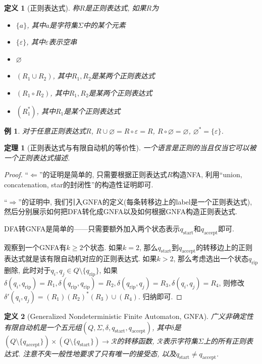 \documentclass[8pt]{article}
\theoremstyle{compact}
\newtheorem{theorem}{定理}[section]
\newtheorem{definition}{定义}[section]
\newtheorem{example}{例}[section]
\def\ge{\geqslant}
\begin{document}
\begin{definition}[正则表达式]
	称$R$是正则表达式, 如果$R$为
	\begin{itemize}
		\item $\{a\}$, 其中$a$是字符集$\Sigma$中的某个元素
		\item $\{\varepsilon\}$, 其中$\varepsilon$表示空串
		\item $\varnothing$
		\item $(R_1 \cup R_2)$, 其中$R_1, R_2$是某两个正则表达式
		\item $(R_1 \circ R_2)$, 其中$R_1, R_2$是某两个正则表达式
		\item $(R_1^*)$, 其中$R_1$是某个正则表达式
	\end{itemize}
\end{definition}
\begin{example}
	对于任意正则表达式$R$, $R \cup \varnothing = R \circ \varepsilon = R$, $R \circ \varnothing = \varnothing$, $\varnothing^* = \{\varepsilon\}$. 
\end{example}
\begin{theorem}[正则表达式与有限自动机的等价性]
	一个语言是正则的当且仅当它可以被一个正则表达式描述. 
\end{theorem}
\begin{proof}
	“$\Leftarrow$”的证明是简单的, 只需要根据正则表达式$R$构造NFA, 利用“union, concatenation, star的封闭性”的构造性证明即可. 

	“$\Rightarrow$”的证明中, 我们引入GNFA的定义(每条转移边上的label是一个正则表达式), 然后分别展示如何把DFA转化成GNFA以及如何根据GNFA构造正则表达式. 

	DFA转GNFA是简单的——只需要额外加入两个状态表示$q_{\text{start}}$和$q_{\text{accept}}$即可. 

	观察到一个GNFA有$k \ge 2$个状态. 如果$k=2$, 那么$q_{\text{start}}$到$q_{\text{accept}}$的转移边上的正则表达式就是该有限自动机对应的正则表达式. 如果$k > 2$, 那么考虑选出一个状态$q_{\text{rip}}$删除, 此时对于$q_i, q_j \in Q \setminus \{q_{\text{rip}}\}$, 如果$\delta(q_i,  q_{\text{rip}}) = R_1, \delta(q_{\text{rip}}, q_{\text{rip}}) = R_2, \delta(q_{\text{rip}}, q_j) = R_3, \delta(q_i, q_j) = R_4$, 则修改$\delta'(q_i, q_j) = (R_1)(R_2)^*(R_3) \cup (R_4)$. 归纳即可. 
\end{proof}
\begin{definition}[Generalized Nondeterministic Finite Automaton, GNFA]
	广义非确定性有限自动机是一个五元组$(Q, \Sigma, \delta, q_{\text{start}}, q_{\text{accept}})$, 其中$\delta$是$(Q \setminus \{q_{\text{accept}}\}) \times (Q \setminus \{q_{\text{start}}\}) \to \mathcal R$的转移函数, $\mathcal R$表示字符集$\Sigma$上的所有正则表达式. 注意不失一般性地要求了只有唯一的接受态, 以及$q_{\text{start}} \neq q_{\text{accept}}$. 
\end{definition}
\end{document}

